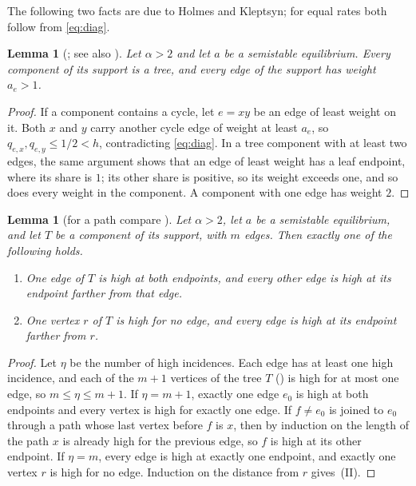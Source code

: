\documentclass[11pt]{article}
\newtheorem{lemma}[theorem]{Lemma}
\theoremstyle{definition}
\theoremstyle{remark}
\begin{document}
The following two facts are due to Holmes and Kleptsyn; for equal rates both follow from \eqref{eq:diag}.

\begin{lemma}[{\cite[Theorem~3, Lemma~4]{HK}; see also \cite[Lemma~4]{Kr}}]\label{lem:hk}
Let $\alpha>2$ and let $a$ be a semistable equilibrium. Every component of its support is a tree, and every edge of the support has weight $a_e>1$.
\end{lemma}

\begin{proof}
If a component contains a cycle, let $e=xy$ be an edge of least weight on it. Both $x$ and $y$ carry another cycle
edge of weight at least $a_e$, so $q_{e,x},q_{e,y}\le 1/2<h$, contradicting \eqref{eq:diag}. In a tree component
with at least two edges, the same argument shows that an edge of least weight has a leaf endpoint, where its
share is $1$; its other share is positive, so its weight exceeds one, and so does every weight in the
component. A component with one edge has weight $2$.
\end{proof}

\begin{lemma}[{for a path compare \cite[Corollary~3]{HHK}}]\label{lem:count}
Let $\alpha>2$, let $a$ be a semistable equilibrium, and let $T$ be a component of its support, with $m$ edges. Then exactly one of the following holds.
\begin{enumerate}[label=(\Roman*)]
\item One edge of $T$ is high at both endpoints, and every other edge is high at its endpoint farther from that edge.
\item One vertex $r$ of $T$ is high for no edge, and every edge is high at its endpoint farther from $r$.
\end{enumerate}
\end{lemma}

\begin{proof}
Let $\eta$ be the number of high incidences. Each edge has at least one high incidence, and each of the $m+1$
vertices of the tree $T$ () is high for at most one edge, so $m\le \eta\le m+1$. If $\eta=m+1$, exactly one edge $e_0$ is high at both endpoints and every vertex is high for exactly one
edge. If $f\ne e_0$ is joined to $e_0$ through a path whose last vertex before $f$ is $x$, then by induction on the
length of the path $x$ is already high for the previous edge, so $f$ is high at its other endpoint. If $\eta=m$, every
edge is high at exactly one endpoint, and exactly one vertex $r$ is high for no edge. Induction on the distance from
$r$ gives~(II).
\end{proof}
\end{document}

